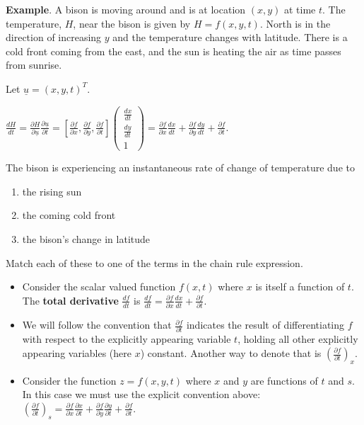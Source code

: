 \documentclass[12pt,letterpaper,noanswers]{exam}
\newcommand{\mb}[1]{\underline{#1}}
\begin{document}
    \vspace{2.5in}
    
    \eject
    
    \noindent\textbf{Example}.  A bison is moving around and is at location $(x,y)$ at time $t$.  The temperature, $H$, near the bison is given by $H = f(x,y,t)$.  North is in the direction of increasing $y$ and the temperature changes with latitude.  There is a cold front coming from the east, and the sun is heating the air as time passes from sunrise.  
 
 Let $\underline{u} = (x,y,t)^T$.
 
 $\displaystyle\frac{dH}{dt} = \frac{\partial H}{\partial\mb{u}}\frac{\partial\mb{u}}{\partial t} = \left[\frac{\partial f}{\partial x}, \frac{\partial f}{\partial y}, \frac{\partial f}{\partial t}\right]\left(\begin{array}{c} \frac{dx}{dt} \\ \frac{dy}{dt} \\ 1 \end{array}\right) = \frac{\partial f}{\partial x}\frac{dx}{dt} + \frac{\partial f}{\partial y}\frac{dy}{dt} + \frac{\partial f}{\partial t}$.
 
 The bison is experiencing an instantaneous rate of change of temperature due to 
 \begin{enumerate}
     \item the rising sun
     \item the coming cold front
     \item the bison's change in latitude
 \end{enumerate}
 
 Match each of these to one of the terms in the chain rule expression.
    
    \begin{tcolorbox}
    \begin{itemize}
        \itemsep0em
    \item Consider the scalar valued function $f(x,t)$ where $x$ is itself a function of $t$.  The \textbf{total derivative} $\displaystyle\frac{df}{dt}$ is $\displaystyle\frac{df}{dt} = \frac{\partial f}{\partial x}\frac{dx}{dt} + \frac{\partial f}{\partial t}$.
    \item We will follow the convention that $\displaystyle\frac{\partial f}{\partial t}$ indicates the result of differentiating $f$ with respect to the explicitly appearing variable $t$, holding all other explicitly appearing variables (here $x$) constant.  Another way to denote that is $\displaystyle\left(\frac{\partial f}{\partial t}\right)_x$.
    \item Consider the function $z = f(x,y,t)$ where $x$ and $y$ are functions of $t$ and $s$.  In this case we must use the explicit convention above: $\displaystyle\left(\frac{\partial f}{\partial t}\right)_s = \frac{\partial f}{\partial x}\frac{\partial x}{\partial t} + \frac{\partial f}{\partial y}\frac{\partial y}{\partial t} + \frac{\partial f}{\partial t}$.
\end{itemize}


\end{tcolorbox}
\end{document}
